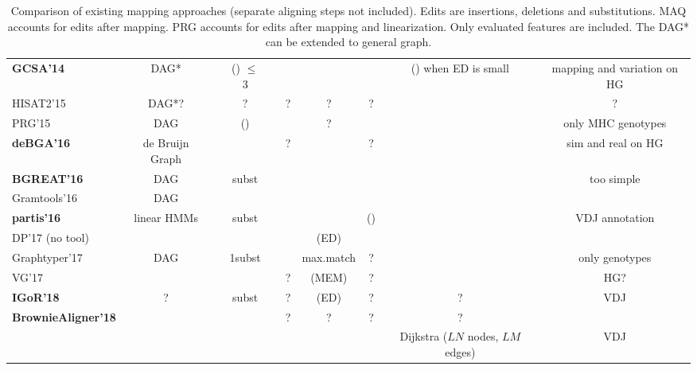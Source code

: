 \begin{table*}
\begin{tabular}{lccccccccc}
		\bf{GCSA'14} \cite{siren2014indexing}			& DAG*			& \y	& (\y) $\leq$ 3 & \n & \n & \n			& \y	& (\y) when ED is small	& mapping and variation on HG		\\
		HISAT2'15 \cite{kim2015hisat,siren2014indexing,langmead2012fast}
														& DAG*?			& \y	& ?		& \n	& ?		& ?				& ?		& \y	& \n?		\\
		PRG'15 \cite{dilthey2015improved}				& DAG			& \y	& (\n)	& \n	& \n	& ?				& \n	& \n	& only MHC genotypes	\\
		\bf{deBGA'16} \cite{liu2016debga}				& de Bruijn Graph& \y	& \n	& \n	& ?		& \n			& ?		& \y	& sim and real on HG		\\
		\bf{BGREAT'16} \cite{limasset2016read}			& DAG			& \y	& subst	& \n	& \n	& \n			& \n	& \y	& too simple \\
		Gramtools'16 \cite{maciuca2016natural}			& DAG			& \y	& \n	& \n	& \n	& \n			& \n	& \y	& \n	\\
		\bf{partis'16} \cite{ralph2016consistency}		& linear HMMs	& \y	& subst	& \n	& \n	& \y			& (\y)	& \n	& VDJ annotation	\\
		DP'17 \cite{rautiainen2017aligning}	(no tool)	& \y			& \y	& \y	& \n	& \n	& \n (ED)		& \y	& \n	& \n	\\
		Graphtyper'17 \cite{eggertsson2017graphtyper}	& DAG			& \y	& 1subst& \n	& \n 	& max.match		& ?		& \y	& only genotypes	\\
		VG'17 \cite{VGtool,paten2017genome,garrison2018variation}	& \y & \y	& \n	& \n	& ?	 	& \n (MEM)		& ?		& \y	& HG?	\\
		\bf{IGoR'18} \cite{marcou2018high}				& ?				& \y	& subst	& \n	& ?		& \n (ED)		& ?		& ?		& VDJ		\\
		\bf{BrownieAligner'18} \cite{Heydari2018}		& \y			& \y	& \y	& \n	& ?		& ?				& ?		& ?		& 		\\
		\bf{\tool}										& \y			& \y	& \y	& \y	& \y 	& \y			& \y 	& Dijkstra ($L N$ nodes, $L M$ edges)	& VDJ		\\
		\bottomrule
	\end{tabular}
	\caption{Comparison of existing mapping approaches (separate aligning steps not included).
		Edits are insertions, deletions and substitutions.
		MAQ accounts for edits after mapping.
		PRG accounts for edits after mapping and linearization.
		Only evaluated features are included. The DAG* can be extended to general graph.
	}
	\label{table:comparison}
\end{table*}

